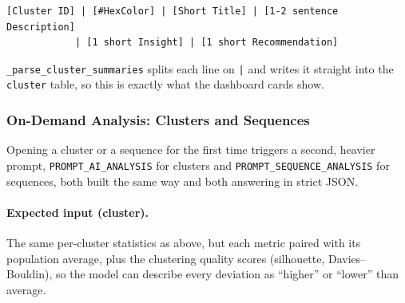 \vspace{0.25cm}

\begin{lstlisting}[style=pythonstyle]
[Cluster ID] | [#HexColor] | [Short Title] | [1-2 sentence Description]
            | [1 short Insight] | [1 short Recommendation]
\end{lstlisting}

\texttt{\_parse\_cluster\_summaries} splits each line on \texttt{|} and writes it straight into the \texttt{cluster} table, so this is exactly what the dashboard cards show.

\subsubsection*{On-Demand Analysis: Clusters and Sequences}

Opening a cluster or a sequence for the first time triggers a second, heavier prompt, \texttt{PROMPT\_AI\_ANALYSIS} for clusters and \texttt{PROMPT\_SEQUENCE\_ANALYSIS} for sequences, both built the same way and both answering in strict JSON.

\paragraph{Expected input (cluster).} The same per-cluster statistics as above, but each metric paired with its population average, plus the clustering quality scores (silhouette, Davies--Bouldin), so the model can describe every deviation as ``higher'' or ``lower'' than average.

\vspace{0.25cm}

